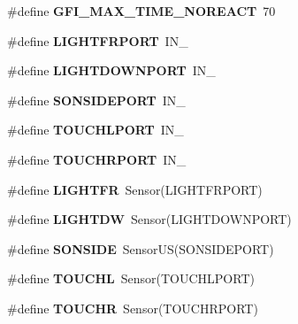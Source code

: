 \begin{DoxyCompactItemize}
\item 
\hypertarget{reactor_8nxc_acf448a4b51caadc3612dd7fe1e6d989c}{
\#define {\bfseries GFI\_\-MAX\_\-TIME\_\-NOREACT}~70}
\label{reactor_8nxc_acf448a4b51caadc3612dd7fe1e6d989c}

\item 
\hypertarget{reactor_8nxc_ab9d3d1049b45438591608c99774c5cba}{
\#define {\bfseries LIGHTFRPORT}~IN\_}
\label{reactor_8nxc_ab9d3d1049b45438591608c99774c5cba}

\item 
\hypertarget{reactor_8nxc_a5103b4e7f1559cfe1f24513bd3d797c2}{
\#define {\bfseries LIGHTDOWNPORT}~IN\_}
\label{reactor_8nxc_a5103b4e7f1559cfe1f24513bd3d797c2}

\item 
\hypertarget{reactor_8nxc_a73b327cc697b593b06f47bc6915ba9cf}{
\#define {\bfseries SONSIDEPORT}~IN\_}
\label{reactor_8nxc_a73b327cc697b593b06f47bc6915ba9cf}

\item 
\hypertarget{reactor_8nxc_a867a2479cd5e144bc98b3e24bd48a79c}{
\#define {\bfseries TOUCHLPORT}~IN\_}
\label{reactor_8nxc_a867a2479cd5e144bc98b3e24bd48a79c}

\item 
\hypertarget{reactor_8nxc_ac16330478e7b003e00f37e90e0c5bdf6}{
\#define {\bfseries TOUCHRPORT}~IN\_}
\label{reactor_8nxc_ac16330478e7b003e00f37e90e0c5bdf6}

\item 
\hypertarget{reactor_8nxc_a26fd581a2d8a8f58a30535495c8d0843}{
\#define {\bfseries LIGHTFR}~Sensor(LIGHTFRPORT)}
\label{reactor_8nxc_a26fd581a2d8a8f58a30535495c8d0843}

\item 
\hypertarget{reactor_8nxc_aadf3c356fd812224ab384f9780155c1a}{
\#define {\bfseries LIGHTDW}~Sensor(LIGHTDOWNPORT)}
\label{reactor_8nxc_aadf3c356fd812224ab384f9780155c1a}

\item 
\hypertarget{reactor_8nxc_aec1d71dea61f39acce761840c4ce0d27}{
\#define {\bfseries SONSIDE}~SensorUS(SONSIDEPORT)}
\label{reactor_8nxc_aec1d71dea61f39acce761840c4ce0d27}

\item 
\hypertarget{reactor_8nxc_a98c4f75c182ff1c7c6f3fb288f4f3857}{
\#define {\bfseries TOUCHL}~Sensor(TOUCHLPORT)}
\label{reactor_8nxc_a98c4f75c182ff1c7c6f3fb288f4f3857}

\item 
\hypertarget{reactor_8nxc_a6537370af17fd38a56bcf670d8db23e3}{
\#define {\bfseries TOUCHR}~Sensor(TOUCHRPORT)}
\label{reactor_8nxc_a6537370af17fd38a56bcf670d8db23e3}


\end{DoxyCompactItemize}
